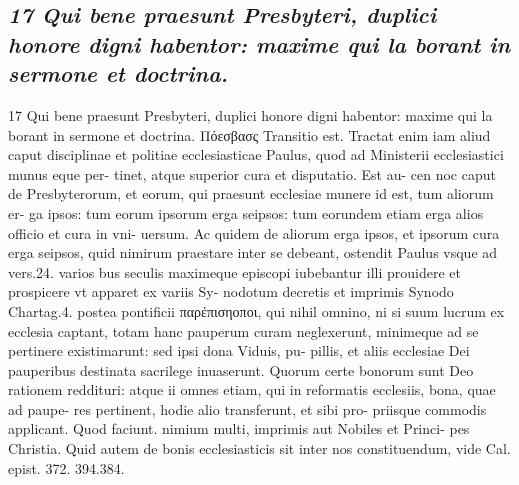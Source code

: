 \documentclass{article}
\begin{document}
\begin{pages}
\subsection*{\textit{17 Qui bene praesunt Presbyteri, duplici honore digni habentor: maxime qui la borant in sermone et doctrina.}}17 Qui bene praesunt Presbyteri, duplici honore digni habentor: maxime qui la borant in sermone et doctrina. Πόεσβασς Transitio est. Tractat enim iam aliud caput disciplinae et politiae ecclesiasticae Paulus, quod ad Ministerii ecclesiastici munus eque per- tinet, atque superior cura et disputatio. Est au- cen noc caput de Presbyterorum, et eorum, qui praesunt ecclesiae munere id est, tum aliorum er- ga ipsos: tum eorum ipsorum erga seipsos: tum eorundem etiam erga alios officio et cura in vni- uersum. Ac quidem de aliorum erga ipsos, et ipsorum cura erga seipsos, quid nimirum praestare inter se debeant, ostendit Paulus vsque ad vers.24. varios  \pend\pstart bus seculis maximeque episcopi iubebantur illi prouidere et prospicere vt apparet ex variis Sy- nodotum decretis et imprimis Synodo Chartag.4. postea pontificii παρέπισηοποι, qui nihil omnino, ni si suum lucrum ex ecclesia captant, totam hanc pauperum curam neglexerunt, minimeque ad se pertinere existimarunt: sed ipsi dona Viduis, pu- pillis, et aliis ecclesiae Dei pauperibus destinata sacrilege inuaserunt. Quorum certe bonorum sunt Deo rationem reddituri: atque ii omnes etiam, qui in reformatis ecclesiis, bona, quae ad paupe- res pertinent, hodie alio transferunt, et sibi pro- priisque commodis applicant. Quod faciunt. nimium multi, imprimis aut Nobiles et Princi- pes Christia. Quid autem de bonis ecclesiasticis sit inter nos constituendum, vide Cal. epist. 372. 394.384.  \pend

\end{pages}
\end{document}
